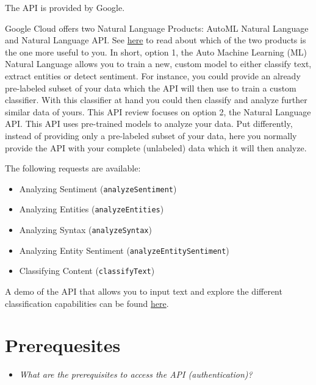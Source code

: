 \documentclass[
]{book}
\providecommand{\tightlist}{%
  \setlength{\itemsep}{0pt}\setlength{\parskip}{0pt}}
\begin{document}
The API is provided by Google.

Google Cloud offers two Natural Language Products: AutoML Natural Language and Natural Language API. See \href{\%22https://cloud.google.com/natural-language\#section-3\%22}{here} to read about which of the two products is the one more useful to you.
In short, option 1, the Auto Machine Learning (ML) Natural Language allows you to train a new, custom model to either classify text, extract entities or detect sentiment. For instance, you could provide an already pre-labeled subset of your data which the API will then use to train a custom classifier. With this classifier at hand you could then classify and analyze further similar data of yours.
This API review focuses on option 2, the Natural Language API. This API uses pre-trained models to analyze your data. Put differently, instead of providing only a pre-labeled subset of your data, here you normally provide the API with your complete (unlabeled) data which it will then analyze.

The following requests are available:

\begin{itemize}
\tightlist
\item
  Analyzing Sentiment (\texttt{analyzeSentiment})
\item
  Analyzing Entities (\texttt{analyzeEntities})
\item
  Analyzing Syntax (\texttt{analyzeSyntax})
\item
  Analyzing Entity Sentiment (\texttt{analyzeEntitySentiment})
\item
  Classifying Content (\texttt{classifyText})
\end{itemize}

A demo of the API that allows you to input text and explore the different classification capabilities can be found \href{\%22https://cloud.google.com/natural-language\#section-2\%22}{here}.

\hypertarget{prerequesites}{%
\section{Prerequesites}\label{prerequesites}}

\begin{itemize}
\tightlist
\item
  \emph{What are the prerequisites to access the API (authentication)? }
\end{itemize}
\end{document}

